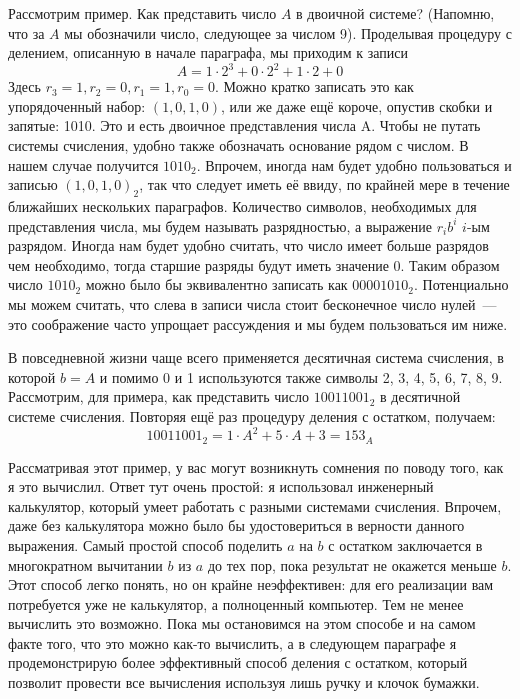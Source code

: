 Рассмотрим пример. Как представить число $A$ в двоичной системе? (Напомню, что за $A$ мы обозначили число, следующее за числом 9). Проделывая процедуру с делением, описанную в начале параграфа, мы приходим к записи
$$A = 1\cdot 2^3 + 0\cdot 2^2 + 1\cdot 2 + 0$$
Здесь $r_3 = 1, r_2 = 0, r_1 = 1, r_0 = 0$. Можно кратко записать это как упорядоченный набор: $(1, 0, 1, 0)$, или же даже ещё короче, опустив скобки и запятые: 1010. Это и есть двоичное представления числа A. Чтобы не путать системы счисления, удобно также обозначать основание рядом с числом. В нашем случае получится $1010_2$. Впрочем, иногда нам будет удобно пользоваться и записью $(1, 0, 1, 0)_2$, так что следует иметь её ввиду, по крайней мере в течение ближайших нескольких параграфов. Количество символов, необходимых для представления числа, мы будем называть разрядностью, а выражение $r_ib^i$ $i$-ым разрядом. Иногда нам будет удобно считать, что число имеет больше разрядов чем необходимо, тогда старшие разряды будут иметь значение 0. Таким образом число $1010_2$ можно было бы эквивалентно записать как $00001010_2$. Потенциально мы можем считать, что слева в записи числа стоит бесконечное число нулей~— это соображение часто упрощает рассуждения и мы будем пользоваться им ниже.

В повседневной жизни чаще всего применяется десятичная система счисления, в которой $b=A$ и помимо 0 и 1 используются также символы 2, 3, 4, 5, 6, 7, 8, 9. Рассмотрим, для примера, как представить число $10011001_2$ в десятичной системе счисления. Повторяя ещё раз процедуру деления с остатком, получаем:
$$10011001_2 = 1\cdot A^2 + 5\cdot A + 3 = 153_A$$

Рассматривая этот пример, у вас могут возникнуть сомнения по поводу того, как я это вычислил. Ответ тут очень простой: я использовал инженерный калькулятор, который умеет работать с разными системами счисления. Впрочем, даже без калькулятора можно было бы удостовериться в верности данного выражения. Самый простой способ поделить $a$ на $b$ с остатком заключается в многократном вычитании $b$ из $a$ до тех пор, пока результат не окажется меньше $b$. Этот способ легко понять, но он крайне неэффективен: для его реализации вам потребуется уже не калькулятор, а полноценный компьютер. Тем не менее вычислить это возможно. Пока мы остановимся на этом способе и на самом факте того, что это можно как-то вычислить, а в следующем параграфе я продемонстрирую более эффективный способ деления с остатком, который позволит провести все вычисления используя лишь ручку и клочок бумажки.


